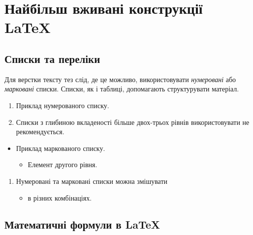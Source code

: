 \documentclass[]{iptconf}
\begin{document}
\section{Найбільш вживані конструкції \LaTeX}





\subsection{Списки та переліки}





Для верстки тексту тез слід, де це можливо, використовувати \emph{нумеровані} або
\emph{марковані} списки. Списки, як і таблиці, допомагають структурувати матеріал.
\begin{enumerate}
	\item Приклад нумерованого списку.
	\item Списки з глибиною вкладеності більше двох-трьох рівнів використовувати не рекомендується.
\end{enumerate}

\begin{itemize}
	\item Приклад маркованого списку.
	      \begin{itemize}
		      \item Елемент другого рівня.
	      \end{itemize}
\end{itemize}

\begin{enumerate}
	\item Нумеровані та марковані списки можна змішувати
	      \begin{itemize}
		      \item в різних комбінаціях.
	      \end{itemize}
\end{enumerate}





\subsection{Математичні формули в \LaTeX}
\end{document}
